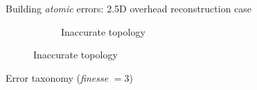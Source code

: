 \documentclass[export]{beamer}
\begin{document}
\begin{frame}{Building \textit{atomic} errors: 2.5D overhead reconstruction case}
\begin{figure}
\begin{center}
\begin{subfigure}{.28\textwidth}
                            \caption{\label{fig::bul_height} Inaccurate topology}
                        \end{subfigure}
                    \end{center}
                \end{figure}
            \end{frame}
            \begin{frame}{Error taxonomy (\textit{finesse} $= 3$)}
                \begin{figure}
                    
                \end{figure}
            \end{frame}
\end{document}
